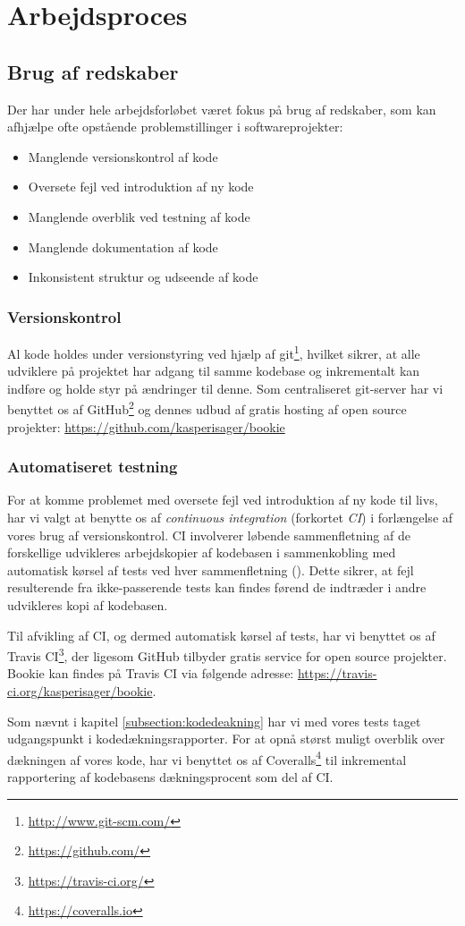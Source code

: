 \chapter{Arbejdsproces}

\section{Brug af redskaber}

Der har under hele arbejdsforløbet været fokus på brug af redskaber, som kan afhjælpe ofte opstående problemstillinger i softwareprojekter:

\begin{itemize}
  \item Manglende versionskontrol af kode
  \item Oversete fejl ved introduktion af ny kode
  \item Manglende overblik ved testning af kode
  \item Manglende dokumentation af kode
  \item Inkonsistent struktur og udseende af kode
\end{itemize}

\subsection{Versionskontrol}

Al kode holdes under versionstyring ved hjælp af git\footnote{\url{http://www.git-scm.com/}}, hvilket sikrer, at alle udviklere på projektet har adgang til samme kodebase og inkrementalt kan indføre og holde styr på ændringer til denne. Som centraliseret git-server har vi benyttet os af GitHub\footnote{\url{https://github.com/}} og dennes udbud af gratis hosting af open source projekter: \url{https://github.com/kasperisager/bookie}

\subsection{Automatiseret testning}

For at komme problemet med oversete fejl ved introduktion af ny kode til livs, har vi valgt at benytte os af \textit{continuous integration} (forkortet \textit{CI}) i forlængelse af vores brug af versionskontrol. CI involverer løbende sammenfletning af de forskellige udvikleres arbejdskopier af kodebasen i sammenkobling med automatisk kørsel af tests ved hver sammenfletning (\cite{wiki:ci}). Dette sikrer, at fejl resulterende fra ikke-passerende tests kan findes førend de indtræder i andre udvikleres kopi af kodebasen.

Til afvikling af CI, og dermed automatisk kørsel af tests, har vi benyttet os af Travis CI\footnote{\url{https://travis-ci.org/}}, der ligesom GitHub tilbyder gratis service for open source projekter. Bookie kan findes på Travis CI via følgende adresse: \url{https://travis-ci.org/kasperisager/bookie}.

Som nævnt i kapitel \ref{subsection:kodedeakning} har vi med vores tests taget udgangspunkt i kodedækningsrapporter. For at opnå størst muligt overblik over dækningen af vores kode, har vi benyttet os af Coveralls\footnote{\url{https://coveralls.io}} til inkremental rapportering af kodebasens dækningsprocent som del af CI.